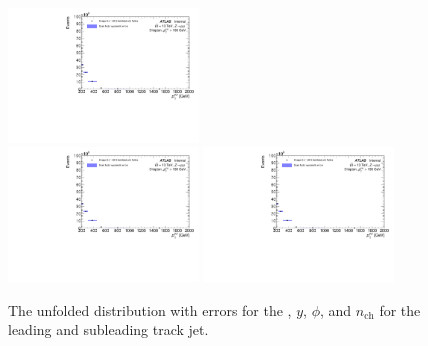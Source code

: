 \begin{figure}[h!]
  \includegraphics[page=516,width=0.45\textwidth]{figures/unfoldErrPlots.pdf} \\
  \includegraphics[page=656,width=0.45\textwidth]{figures/unfoldErrPlots.pdf}
  \includegraphics[page=684,width=0.45\textwidth]{figures/unfoldErrPlots.pdf}
  \caption{The unfolded distribution with errors for the \pt, $y$, $\phi$, and $n_{\text{ch}}$ for the leading and subleading track jet.}
  \label{fig:unfoldErr2}
\end{figure}

